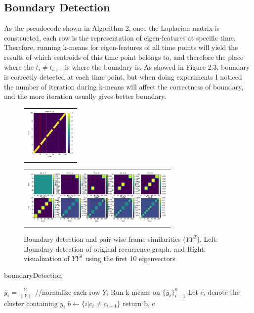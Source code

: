 \documentclass[final]{siamltexmm}
\begin{document}
\subsection{Boundary Detection}
As the pseudocode shown in Algorithm 2, once the Laplacian matrix is constructed, each row is the representation of eigen-features at specific time. Therefore, running k-means for eigen-features of all time points will yield the results of which centroids of this time point belongs to, and therefore the place where the $t_{i} \neq t_{i+1}$ is where the boundary is. As showed in Figure 2.3, boundary is correctly detected at each time point, but when doing experiments I noticed the number of iteration during k-means will affect the correctness of boundary, and the more iteration usually gives better boundary.
\begin{figure}[H]
\centering
\begin{subfigure}
  \begin{tabular}{c}
  \includegraphics[width=25mm]{./figure/o3_boundary.png}
  \end{tabular}{}
\end{subfigure}
  \begin{tabular}{c}
  \includegraphics[width=75mm]{./figure/o3_eachM.png}
  \end{tabular}{}
\begin{subfigure}
\end{subfigure}
\caption{Boundary detection and pair-wise frame similarities ($YY^T$). Left: Boundary detection of original recurrence graph, and Right: visualization of $YY^T$ using the first 10 eigenvectors}
\end{figure}

\begin{algorithm}[htb]
  \caption{boundaryDetection}

  \label{algo:SC}
\begin{algorithmic}[1]
  \STATE $ \overline y_i = \frac{Y_i}{\parallel Y \parallel}$ //normalize each row $Y_i$
  \STATE Run k-means on $\{ \overline y_i \}_{i=1}^{n}$
  \STATE Let $c_i$ denote the cluster containing $ \overline y_i$
  \STATE $b \leftarrow \{ i|c_i \neq c_{i+1}\}$
  \STATE return b, c
\end{algorithmic}
\end{algorithm}
\end{document}

